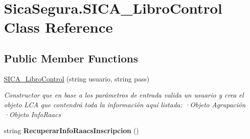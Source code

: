 \hypertarget{class_sica_segura_1_1_s_i_c_a___libro_control}{}\section{Sica\+Segura.\+S\+I\+C\+A\+\_\+\+Libro\+Control Class Reference}
\label{class_sica_segura_1_1_s_i_c_a___libro_control}
\subsection*{Public Member Functions}
\begin{DoxyCompactItemize}
\item 
\hyperlink{class_sica_segura_1_1_s_i_c_a___libro_control_ad4df323bd4511411724db38cb1c43e0e}{S\+I\+C\+A\+\_\+\+Libro\+Control} (string usuario, string pass)
\begin{DoxyCompactList}\small\item\em Constructor que en base a los parámetros de entrada valida un usuario y crea el objeto L\+CA que contendrá toda la información aquí listada\+: ·\+Objeto Agrupación ·\+Objeto Info\+Raacs \end{DoxyCompactList}\item 
string {\bfseries Recuperar\+Info\+Raacs\+Inscripcion} ()\hypertarget{class_sica_segura_1_1_s_i_c_a___libro_control_ab6c928f999bed799c8ee00c50d902e12}{}\label{class_sica_segura_1_1_s_i_c_a___libro_control_ab6c928f999bed799c8ee00c50d902e12}

\end{DoxyCompactItemize}
